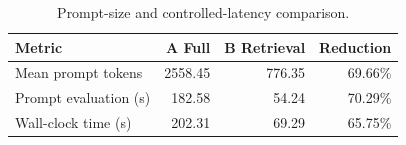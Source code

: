 \begin{table}[htbp]
\centering
\caption{Prompt-size and controlled-latency comparison.}
\label{tab:efficiency-latency}
\begin{tabular}{lrrr}
\toprule
Metric & A Full & B Retrieval & Reduction \\
\midrule
Mean prompt tokens & 2558.45 & 776.35 & 69.66\% \\
Prompt evaluation (s) & 182.58 & 54.24 & 70.29\% \\
Wall-clock time (s) & 202.31 & 69.29 & 65.75\% \\
\bottomrule
\end{tabular}
\end{table}
